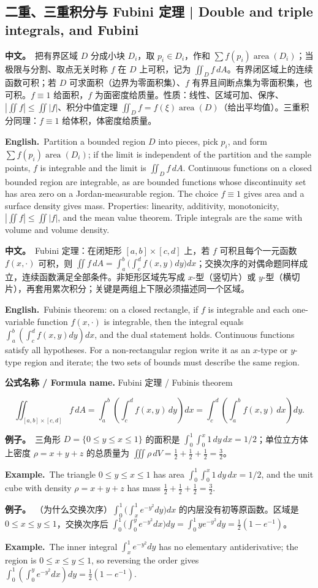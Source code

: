 \documentclass[UTF8,11pt,a4paper]{ctexart}
\newcommand{\BOTH}[2]{\par\noindent\textbf{中文。}\ #1\par\noindent\textbf{English.}\ #2\par}
\newcommand{\EX}[2]{\par\noindent\textbf{例子。}\ #1\par\noindent\textbf{Example.}\ #2\par}
\newcommand{\FORMULA}[2]{\par\noindent\textbf{公式名称 / Formula name.} #1 / #2\par}
\begin{document}
\subsection{二重、三重积分与 Fubini 定理 | Double and triple integrals, and Fubini}
\BOTH{把有界区域 $D$ 分成小块 $D_i$，取 $p_i\in D_i$，作和 $\sum f(p_i)\operatorname{area}(D_i)$；当极限与分割、取点无关时称 $f$ 在 $D$ 上可积，记为 $\iint_Df\,dA$。有界闭区域上的连续函数可积；若 $D$ 可求面积（边界为零面积集）、$f$ 有界且间断点集为零面积集，也可积。$f\equiv1$ 给面积，$f$ 为面密度给质量。性质：线性、区域可加、保序、$|\iint f|\le\iint|f|$、积分中值定理 $\iint_Df=f(\xi)\operatorname{area}(D)$（给出平均值）。三重积分同理：$f\equiv1$ 给体积，体密度给质量。}{Partition a bounded region $D$ into pieces, pick $p_i$, and form $\sum f(p_i)\operatorname{area}(D_i)$; if the limit is independent of the partition and the sample points, $f$ is integrable and the limit is $\iint_Df\,dA$. Continuous functions on a closed bounded region are integrable, as are bounded functions whose discontinuity set has area zero on a Jordan-measurable region. The choice $f\equiv1$ gives area and a surface density gives mass. Properties: linearity, additivity, monotonicity, $|\iint f|\le\iint|f|$, and the mean value theorem. Triple integrals are the same with volume and volume density.}
\BOTH{Fubini 定理：在闭矩形 $[a,b]\times[c,d]$ 上，若 $f$ 可积且每个一元函数 $f(x,\cdot)$ 可积，则 $\iint f\,dA=\int_a^b\bigl(\int_c^df(x,y)dy\bigr)dx$；交换次序的对偶命题同样成立，连续函数满足全部条件。非矩形区域先写成 $x$-型（竖切片）或 $y$-型（横切片），再套用累次积分；关键是两组上下限必须描述同一个区域。}{Fubini\textquotesingle s theorem: on a closed rectangle, if $f$ is integrable and each one-variable function $f(x,\cdot)$ is integrable, then the integral equals $\int_a^b(\int_c^df(x,y)dy)dx$, and the dual statement holds. Continuous functions satisfy all hypotheses. For a non-rectangular region write it as an $x$-type or $y$-type region and iterate; the two sets of bounds must describe the same region.}
\FORMULA{Fubini 定理}{Fubini\textquotesingle s theorem}
\[
\iint_{[a,b]\times[c,d]}f\,dA=\int_a^b\!\left(\int_c^d f(x,y)\,dy\right)dx
=\int_c^d\!\left(\int_a^b f(x,y)\,dx\right)dy .
\]
\EX{三角形 $D=\{0\le y\le x\le1\}$ 的面积是 $\int_0^1\int_0^x1\,dy\,dx=1/2$；单位立方体上密度 $\rho=x+y+z$ 的总质量为 $\iiint\rho\,dV=\frac12+\frac12+\frac12=\frac32$。}{The triangle $0\le y\le x\le1$ has area $\int_0^1\int_0^x1\,dy\,dx=1/2$, and the unit cube with density $\rho=x+y+z$ has mass $\frac12+\frac12+\frac12=\frac32$.}
\EX{（为什么交换次序）$\int_0^1\bigl(\int_x^1e^{-y^2}dy\bigr)dx$ 的内层没有初等原函数。区域是 $0\le x\le y\le1$，交换次序后 $\int_0^1\bigl(\int_0^ye^{-y^2}dx\bigr)dy=\int_0^1ye^{-y^2}dy=\frac12(1-e^{-1})$。}{The inner integral $\int_x^1e^{-y^2}dy$ has no elementary antiderivative; the region is $0\le x\le y\le1$, so reversing the order gives $\int_0^1(\int_0^ye^{-y^2}dx)dy=\frac12(1-e^{-1})$.}
\end{document}
